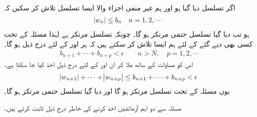 \quad {}\\
اگر تسلسل  دیا گیا ہو اور ہم غیر منفی اجزاء والا ایسا تسلسل  تلاش کر سکیں کہ
\begin{align}\label{مساوات_ترتیب_جانچ_مقابلہ_الف}
\abs{w_n}\le b_n\quad n=1,2,\cdots
\end{align}
ہو تب دیا گیا تسلسل حتمی مرتکز ہو گا۔
\quad
چونکہ تسلسل  مرتکز ہے  لہٰذا مسئلہ  کے تحت کسی بھی دیے گئے  کے لئے ہم ایسا  تلاش کر سکتے ہیں کہ ہر  اور  کے لئے درج ذیل ہو گا۔
\begin{align*}
b_{n+1}+\cdots+b_{n+p}<\epsilon \quad \quad n>N,\quad p=1,2,\cdots
\end{align*}
اس کو مساوات  کے ساتھ ملا کر ان  اور  کے لئے درج ذیل اخذ کیا جا سکتا ہے۔
\begin{align*}
\abs{w_{n+1}}+\cdots+\abs{w_{n+p}}\le b_{n+1}+\cdots+b_{n+p}<\epsilon
\end{align*}
یوں مسئلہ  کے تحت تسلسل  مرتکز ہو گا اور دیا گیا تسلسل حتمی مرتکز ہو گا۔

مسئلہ  سے دو اہم آزمائشیں  اخذ کرنے کی خاطر درج ذیل ثابت کرتے ہیں۔

